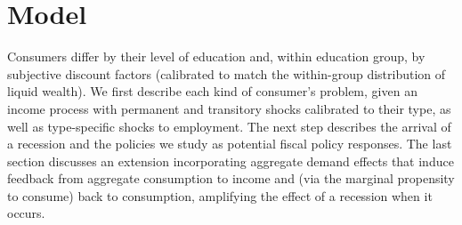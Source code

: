 \documentclass{econsocart}
\begin{document}
\whenintegrated{%
}

\section{Model}\whenintegrated{\label{model}}
\whenintegrated{\label{sec:model}} %

Consumers differ by their level of education and, within education group, by subjective discount factors (calibrated to match the within-group distribution of liquid wealth). We first describe each kind of consumer's problem, given an income process with permanent and transitory shocks calibrated to their type, as well as type-specific shocks to employment. The next step describes the arrival of a recession and the policies we study as potential fiscal policy responses. The last section discusses an extension incorporating aggregate demand effects that induce feedback from aggregate consumption to income and (via the marginal propensity to consume) back to consumption, amplifying the effect of a recession when it occurs.
\end{document}
